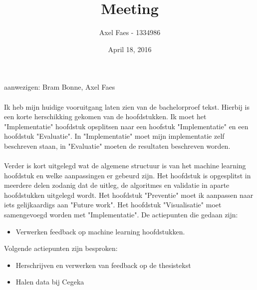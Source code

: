 \documentclass[notitlepage]{article}
\title{Meeting}
\author{Axel Faes - 1334986}
\date{April 18, 2016}
\begin{document}
\maketitle

aanwezigen: Bram Bonne, Axel Faes \\
\\
Ik heb mijn huidige vooruitgang laten zien van de bachelorproef tekst. Hierbij is een korte herschikking gekomen van de hoofdstukken. Ik moet het "Implementatie" hoofdstuk opsplitsen naar een hoofstuk "Implementatie" en een hoofdstuk "Evaluatie". In "Implementatie" moet mijn implementatie zelf beschreven staan, in "Evaluatie" moeten de resultaten beschreven worden. \\\\
Verder is kort uitgelegd wat de algemene structuur is van het machine learning hoofdstuk en welke aanpassingen er gebeurd zijn. Het hoofdstuk is opgesplitst in meerdere delen zodanig dat de uitleg, de algoritmes en validatie in aparte hoofdstukken uitgelegd wordt. Het hoofdstuk "Preventie" moet ik aanpassen naar iets gelijkaardigs aan "Future work". Het hoofdstuk "Visualisatie" moet samengevoegd worden met "Implementatie".
De actiepunten die gedaan zijn:
\begin{itemize}  
        \item  Verwerken feedback op machine learning hoofdstukken.
\end{itemize}

Volgende actiepunten zijn besproken:
\begin{itemize}  		
		\item Herschrijven en verwerken van feedback op de thesistekst
        \item Halen data bij Cegeka
\end{itemize}
\end{document}
